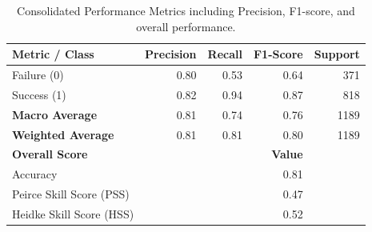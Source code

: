 \documentclass[stu,12pt,floatsintext]{apa7}
\begin{document}
\begin{table}[ht]
\centering
\caption{Consolidated Performance Metrics including Precision, F1-score, and overall performance.}
\label{tab:final_metrics}
\begin{tabular}{lrrrr}
\toprule
\textbf{Metric / Class} & \textbf{Precision} & \textbf{Recall} & \textbf{F1-Score} & \textbf{Support} \\
\midrule
Failure (0)    & 0.80 & 0.53 & 0.64 & 371 \\
Success (1)    & 0.82 & 0.94 & 0.87 & 818 \\
\midrule
\textbf{Macro Average} & 0.81 & 0.74 & 0.76 & 1189 \\
\textbf{Weighted Average} & 0.81 & 0.81 & 0.80 & 1189 \\
\midrule[\heavyrulewidth]
\textbf{Overall Score} & \multicolumn{3}{r}{\textbf{Value}} \\
\midrule
Accuracy & \multicolumn{3}{r}{0.81} \\
Peirce Skill Score (PSS) & \multicolumn{3}{r}{0.47} \\
Heidke Skill Score (HSS) & \multicolumn{3}{r}{0.52} \\
\bottomrule
\end{tabular}
\end{table}

\printbibliography
\end{document}
